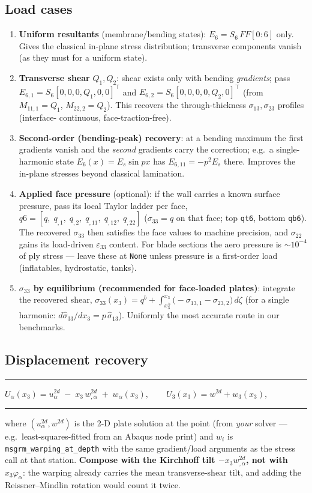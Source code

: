 \documentclass[11pt]{article}
\newcommand{\code}[1]{\texttt{#1}}
\newenvironment{keybox}%
{\par\medskip\noindent\begin{minipage}{\textwidth}\hrule\medskip}%
{\medskip\hrule\end{minipage}\medskip\par}
\begin{document}
\subsection{Load cases}\label{sec:loadcases}
\begin{enumerate}
\item \textbf{Uniform resultants} (membrane/bending states):
  $E_6=S_6\,F\!F[0{:}6]$ only.  Gives the classical in-plane stress
  distribution; transverse components vanish (as they must for a
  uniform state).
\item \textbf{Transverse shear} $Q_1,Q_2$: shear exists only with
  bending \emph{gradients}; pass
  $E_{6,1}=S_6[0,0,0,Q_1,0,0]^{\top}$ and
  $E_{6,2}=S_6[0,0,0,0,Q_2,0]^{\top}$
  (from $M_{11,1}=Q_1$, $M_{22,2}=Q_2$).  This recovers the
  through-thickness $\sigma_{13},\sigma_{23}$ profiles (interface-
  continuous, face-traction-free).
\item \textbf{Second-order (bending-peak) recovery}: at a bending
  maximum the first gradients vanish and the \emph{second} gradients
  carry the correction; e.g.\ a single-harmonic state
  $E_6(x)=E_s\sin px$ has $E_{6,11}=-p^2E_s$ there.  Improves the
  in-plane stresses beyond classical lamination.
\item \textbf{Applied face pressure} (optional): if the wall carries a
  known surface pressure, pass its local Taylor ladder per face,
  $q6=[q,\;q_{,1},\;q_{,2},\;q_{,11},\;q_{,12},\;q_{,22}]$
  ($\sigma_{33}=q$ on that face; top \code{qt6}, bottom \code{qb6}).
  The recovered $\sigma_{33}$ then satisfies the face values to
  machine precision, and $\sigma_{22}$ gains its load-driven
  $\varepsilon_{33}$ content.  For blade sections the aero pressure is
  $\sim10^{-4}$ of ply stress --- leave these at \code{None} unless
  pressure is a first-order load (inflatables, hydrostatic, tanks).
\item \textbf{$\sigma_{33}$ by equilibrium (recommended for
  face-loaded plates)}: integrate the recovered shear,
  $\displaystyle \sigma_{33}(x_3)=q^{b}+\int_{x_3^{\,b}}^{x_3}
  \bigl(-\sigma_{13,1}-\sigma_{23,2}\bigr)\,d\zeta$ (for a single
  harmonic: $d\hat\sigma_{33}/dx_3 = p\,\hat\sigma_{13}$).  Uniformly
  the most accurate route in our benchmarks.
\end{enumerate}

\subsection{Displacement recovery}
\begin{keybox}
$U_\alpha(x_3) = u_\alpha^{2d} \;-\; x_3\,w^{2d}_{,\alpha}
                \;+\; w_\alpha(x_3),\qquad
 U_3(x_3) = w^{2d} + w_3(x_3),$
\end{keybox}
where $(u^{2d}_\alpha, w^{2d})$ is the 2-D plate solution at the point
(from \emph{your} solver --- e.g.\ least-squares-fitted from an Abaqus
node print) and $w_i$ is \code{msgrm\_warping\_at\_depth} with the same
gradient/load arguments as the stress call at that station.
\textbf{Compose with the Kirchhoff tilt $-x_3 w^{2d}_{,\alpha}$, not
with $x_3\varphi_\alpha$}: the warping already carries the mean
transverse-shear tilt, and adding the Reissner--Mindlin rotation would
count it twice.
\end{document}
